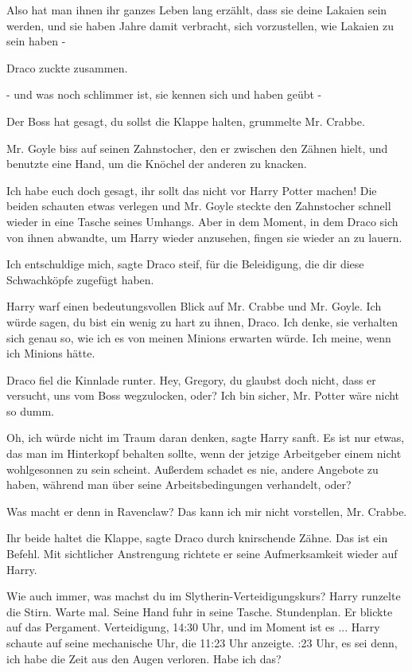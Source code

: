 \glqq Also hat man ihnen ihr ganzes Leben lang erzählt, dass sie deine Lakaien
sein werden, und sie haben Jahre damit verbracht, sich vorzustellen, wie Lakaien
zu sein haben -\grqq{}

Draco zuckte zusammen.

\glqq - und was noch schlimmer ist, sie kennen sich und haben geübt -\grqq{}

\glqq Der Boss hat gesagt, du sollst die Klappe halten\grqq{}, grummelte Mr.
Crabbe.

Mr. Goyle biss auf seinen Zahnstocher, den er zwischen den Zähnen hielt, und
benutzte eine Hand, um die Knöchel der anderen zu knacken.

\glqq Ich habe euch doch gesagt, ihr sollt das nicht vor Harry Potter
machen!\grqq{} Die beiden schauten etwas verlegen und Mr. Goyle steckte den
Zahnstocher schnell wieder in eine Tasche seines Umhangs. Aber in dem Moment, in
dem Draco sich von ihnen abwandte, um Harry wieder anzusehen, fingen sie wieder
an zu lauern.

\glqq Ich entschuldige mich\grqq{}, sagte Draco steif, \glqq für die
Beleidigung, die dir diese Schwachköpfe zugefügt haben.\grqq{}

Harry warf einen bedeutungsvollen Blick auf Mr. Crabbe und Mr. Goyle. \glqq Ich
würde sagen, du bist ein wenig zu hart zu ihnen, Draco. Ich denke, sie verhalten
sich genau so, wie ich es von meinen Minions erwarten würde. Ich meine, wenn ich
Minions hätte.\grqq{}

Draco fiel die Kinnlade runter. \glqq Hey, Gregory, du glaubst doch nicht, dass
er versucht, uns vom Boss wegzulocken, oder?\grqq{} \glqq Ich bin sicher, Mr.
Potter wäre nicht so dumm.\grqq{}

\glqq Oh, ich würde nicht im Traum daran denken\grqq{}, sagte Harry sanft. \glqq
Es ist nur etwas, das man im Hinterkopf behalten sollte, wenn der jetzige
Arbeitgeber einem nicht wohlgesonnen zu sein scheint. Außerdem schadet es nie,
andere Angebote zu haben, während man über seine Arbeitsbedingungen verhandelt,
oder?\grqq{}

\glqq Was macht er denn in Ravenclaw?\grqq{} \glqq Das kann ich mir nicht
vorstellen, Mr. Crabbe.\grqq{}

\glqq Ihr beide haltet die Klappe\grqq{}, sagte Draco durch knirschende Zähne.
\glqq Das ist ein Befehl.\grqq{} Mit sichtlicher Anstrengung richtete er seine
Aufmerksamkeit wieder auf Harry.

\glqq Wie auch immer, was machst du im Slytherin-Verteidigungskurs?\grqq{} Harry
runzelte die Stirn. \glqq Warte mal.\grqq{} Seine Hand fuhr in seine Tasche.
\glqq Stundenplan.\grqq{} Er blickte auf das Pergament. \glqq Verteidigung,
14:30 Uhr, und im Moment ist es ...\grqq{} Harry schaute auf seine mechanische
Uhr, die 11:23 Uhr anzeigte. :23 Uhr, es sei denn, ich habe die Zeit aus
den Augen verloren. Habe ich das?\grqq{}

